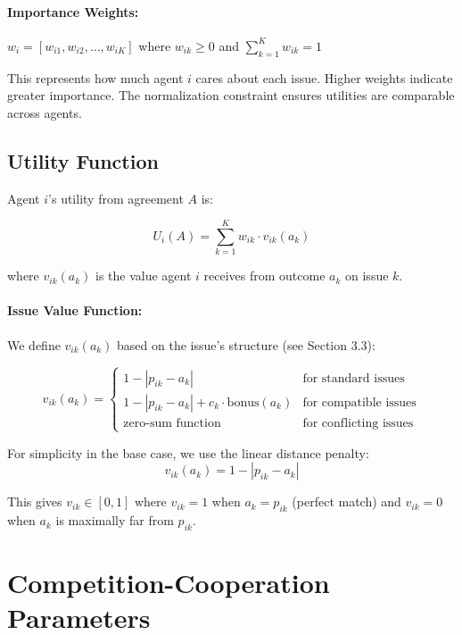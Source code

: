 \documentclass[11pt]{article}
\begin{document}
\paragraph{Importance Weights:} $w_i = [w_{i1}, w_{i2}, \ldots, w_{iK}]$ where $w_{ik} \geq 0$ and $\sum_{k=1}^{K} w_{ik} = 1$

This represents how much agent $i$ cares about each issue. Higher weights indicate greater importance. The normalization constraint ensures utilities are comparable across agents.

\subsection{Utility Function}

Agent $i$'s utility from agreement $A$ is:

\begin{equation}
U_i(A) = \sum_{k=1}^{K} w_{ik} \cdot v_{ik}(a_k)
\end{equation}

where $v_{ik}(a_k)$ is the value agent $i$ receives from outcome $a_k$ on issue $k$.

\paragraph{Issue Value Function:} We define $v_{ik}(a_k)$ based on the issue's structure (see Section 3.3):

\begin{equation}
v_{ik}(a_k) = \begin{cases}
1 - |p_{ik} - a_k| & \text{for standard issues} \\
1 - |p_{ik} - a_k| + c_k \cdot \text{bonus}(a_k) & \text{for compatible issues} \\
\text{zero-sum function} & \text{for conflicting issues}
\end{cases}
\end{equation}

For simplicity in the base case, we use the linear distance penalty:
\begin{equation}
v_{ik}(a_k) = 1 - |p_{ik} - a_k|
\end{equation}

This gives $v_{ik} \in [0,1]$ where $v_{ik} = 1$ when $a_k = p_{ik}$ (perfect match) and $v_{ik} = 0$ when $a_k$ is maximally far from $p_{ik}$.

\section{Competition-Cooperation Parameters}
\end{document}
